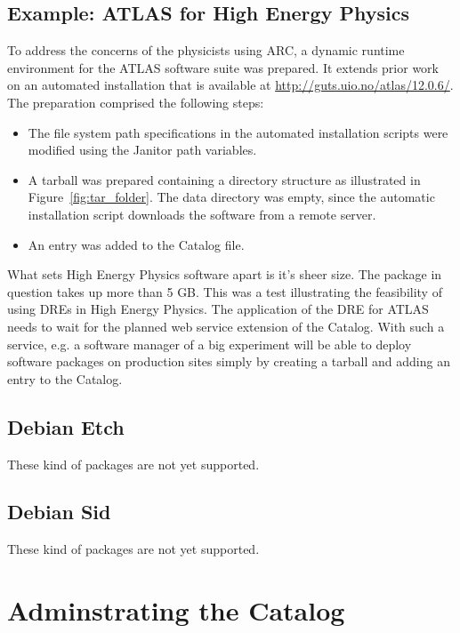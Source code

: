 \subsection{Example: ATLAS for High Energy Physics}


To address the concerns of the physicists using ARC, a dynamic runtime environment for the
ATLAS software suite was prepared. It extends prior work on an automated installation that is available at
\href{http://guts.uio.no/atlas/12.0.6/}{http://guts.uio.no/atlas/12.0.6/}. The preparation comprised the following steps:
\begin{itemize}
    \item The file system path specifications in the automated installation scripts were modified using the Janitor
       path variables.
    \item A tarball was prepared containing a directory structure as illustrated in Figure~\ref{fig:tar_folder}. The data directory
       was empty, since the automatic installation script downloads the software from a remote server.
    \item An entry was added to the Catalog file.
\end{itemize}
What sets High Energy Physics software apart is it's sheer size. The package in question takes up more than
5 GB. This was a test illustrating the feasibility of using DREs in High Energy Physics. The application
of the DRE for ATLAS needs to wait for the planned web service extension of the Catalog. With such a
service, e.g. a software manager of a big experiment will be able to deploy software packages on production
sites simply by creating a tarball and adding an entry to the Catalog.

\subsection{Debian Etch}

These kind of packages are not yet supported.

\subsection{Debian Sid}

These kind of packages are not yet supported.

\section{Adminstrating the Catalog}


